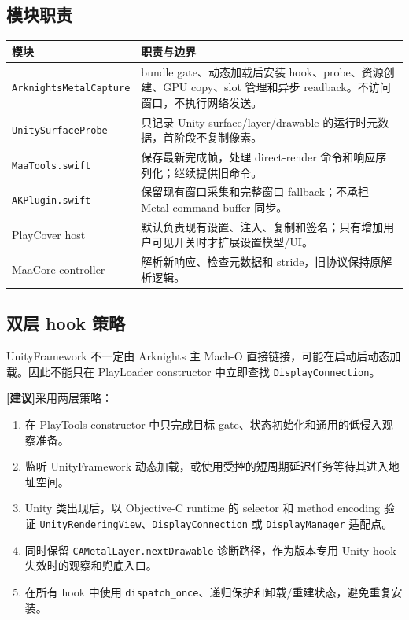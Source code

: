\documentclass[UTF8,a4paper,11pt]{ctexart}
\newcommand{\recommend}{\textbf{\color{recommend}[建议]}}
\begin{document}
\subsection{模块职责}

\begin{center}
\small
\begin{tabularx}{\textwidth}{>{\raggedright\arraybackslash}p{} X}
\toprule
模块 & 职责与边界 \\
\midrule
\texttt{ArknightsMetalCapture} & bundle gate、动态加载后安装 hook、probe、资源创建、GPU copy、slot 管理和异步 readback。不访问窗口，不执行网络发送。\\
\texttt{UnitySurfaceProbe} & 只记录 Unity surface/layer/drawable 的运行时元数据，首阶段不复制像素。\\
\texttt{MaaTools.swift} & 保存最新完成帧，处理 direct-render 命令和响应序列化；继续提供旧命令。\\
\texttt{AKPlugin.swift} & 保留现有窗口采集和完整窗口 fallback；不承担 Metal command buffer 同步。\\
PlayCover host & 默认负责现有设置、注入、复制和签名；只有增加用户可见开关时才扩展设置模型/UI。\\
MaaCore controller & 解析新响应、检查元数据和 stride，旧协议保持原解析逻辑。\\
\bottomrule
\end{tabularx}
\end{center}

\subsection{双层 hook 策略}

UnityFramework 不一定由 Arknights 主 Mach-O 直接链接，可能在启动后动态加载。因此不能只在 PlayLoader constructor 中立即查找 \texttt{DisplayConnection}。

\recommend{}采用两层策略：

\begin{enumerate}
  \item 在 PlayTools constructor 中只完成目标 gate、状态初始化和通用的低侵入观察准备。
  \item 监听 UnityFramework 动态加载，或使用受控的短周期延迟任务等待其进入地址空间。
  \item Unity 类出现后，以 Objective-C runtime 的 selector 和 method encoding 验证 \texttt{UnityRenderingView}、\texttt{DisplayConnection} 或 \texttt{DisplayManager} 适配点。
  \item 同时保留 \texttt{CAMetalLayer.nextDrawable} 诊断路径，作为版本专用 Unity hook 失效时的观察和兜底入口。
  \item 在所有 hook 中使用 \texttt{dispatch\_once}、递归保护和卸载/重建状态，避免重复安装。
\end{enumerate}
\end{document}
